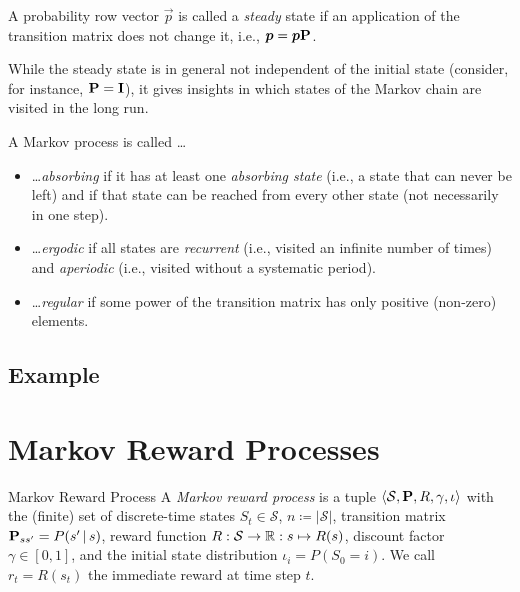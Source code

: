 		\begin{definition}
			A probability row vector \(\vec{p}\) is called a \emph{steady} state if an application of the transition matrix does not change it, i.e., \( \bm{p} = \bm{p} \bm{\mathrm{P}} \).
		\end{definition}
		\begin{remark}
			While the steady state is in general not independent of the initial state (consider, for instance, \( \bm{\mathrm{P}} = \bm{\mathrm{I}} \)), it gives insights in which states of the Markov chain are visited in the long run.
		\end{remark}

		\begin{definition}
			A Markov process is called \dots
			\begin{itemize}
				\item \dots \emph{absorbing} if it has at least one \emph{absorbing state} (i.e., a state that can never be left) and if that state can be reached from every other state (not necessarily in one step).
				\item \dots \emph{ergodic} if all states are \emph{recurrent} (i.e., visited an infinite number of times) and \emph{aperiodic} (i.e., visited without a systematic period).
				\item \dots \emph{regular} if some power of the transition matrix has only positive (non-zero) elements.
			\end{itemize}
		\end{definition}

		\subsection{Example}

	\section{Markov Reward Processes}
		\begin{definition}{Markov Reward Process}  \label{def:mrp}
			A \emph{Markov reward process} is a tuple \( \langle \mathcal{S}, \bm{\mathrm{P}}, R, \gamma, \iota \rangle \) with the (finite) set of discrete-time states \(S_t \in \mathcal{S}\), \(n \coloneqq \lvert \mathcal{S} \rvert\), transition matrix \( \bm{\mathrm{P}}_{ss'} = P(s' \,\vert\, s) \), reward function \( R : \mathcal{S} \to \mathbb{R} : s \mapsto R(s) \), discount factor \( \gamma \in [0, 1] \), and the initial state distribution \( \iota_i = P(S_0 = i) \). We call \( r_t = R(s_t) \) the immediate reward at time step \(t\).
		\end{definition}

